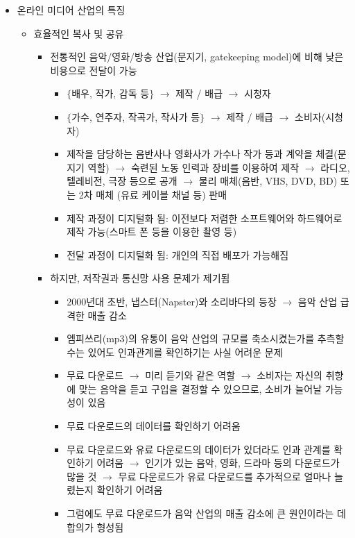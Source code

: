 \begin{itemize}
\begin{itemize}
		
	\end{itemize}

\item 온라인 미디어 산업의 특징 \citep{Sherman:2016ur}
	\begin{itemize}
	\item 효율적인 복사 및 공유
		\begin{itemize}
		\item 전통적인 음악/영화/방송 산업(문지기, gatekeeping model)에 비해 낮은 비용으로 전달이 가능
			\begin{itemize}
			\item $\{$배우, 작가, 감독 등$\}$ $\rightarrow$ 제작 / 배급 $\rightarrow$ 시청자 
			\item $\{$가수, 연주자, 작곡가, 작사가 등$\}$ $\rightarrow$ 제작 / 배급 $\rightarrow$ 소비자(시청자)
			\item 제작을 담당하는 음반사나 영화사가 가수나 작가 등과 계약을 체결(문지기 역할) $\rightarrow$ 숙련된 노동 인력과 장비를 이용하여 제작 $\rightarrow$ 라디오, 텔레비전, 극장 등으로 공개 $\rightarrow$ 물리 매체(음반, VHS, DVD, BD)  또는 2차 매체 (유료 케이블 채널 등) 판매
			\item 제작 과정이 디지털화 됨:  이전보다 저렴한 소프트웨어와 하드웨어로 제작 가능(스마트 폰 등을 이용한  촬영 등)
			\item 전달 과정이 디지털화 됨: 개인의 직접 배포가 가능해짐
			\end{itemize}
		\item 하지만, 저작권과 통신망 사용 문제가 제기됨
			\begin{itemize}
			\item 2000년대 초반, 냅스터(Napster)와 소리바다의 등장 $\rightarrow$ 음악 산업 급격한 매출 감소
			\item 엠피쓰리(mp3)의 유통이 음악 산업의 규모를 축소시켰는가를 추측할 수는 있어도 인과관계를 확인하기는 사실 어려운 문제
			\item 무료 다운로드 $\rightarrow$ 미리 듣기와 같은 역할 $\rightarrow$ 소비자는 자신의 취향에 맞는 음악을 듣고 구입을 결정할 수 있으므로, 소비가 늘어날 가능성이 있음
			\item 무료 다운로드의 데이터를 확인하기 어려움
			\item 무료 다운로드와 유료 다운로드의 데이터가 있더라도 인과 관계를 확인하기 어려움 $\rightarrow$  인기가 있는 음악, 영화, 드라마 등의 다운로드가 많을 것 $\rightarrow$ 무료 다운로드가 유료 다운로드를 추가적으로 얼마나 늘렸는지 확인하기 어려움
			\item 그럼에도 무료 다운로드가 음악 산업의 매출 감소에 큰 원인이라는 데 합의가 형성됨 \citep{Waldfogel:2017aa}

\end{itemize}
\end{itemize}
\end{itemize}
\end{itemize}
